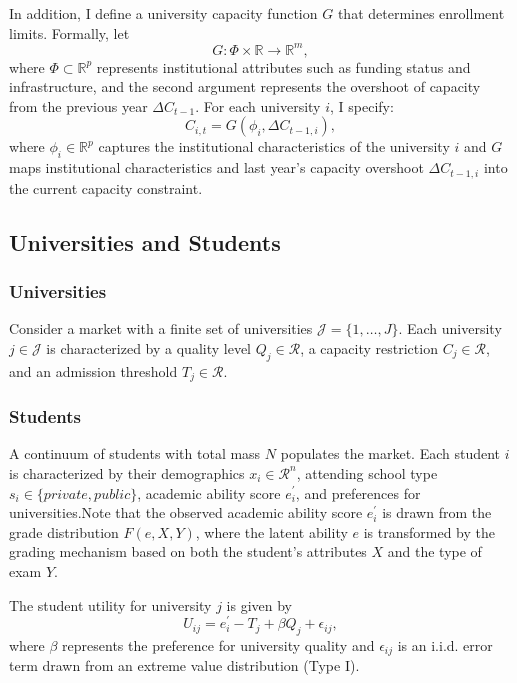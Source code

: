 In addition, I define a university capacity function \( G \) that determines enrollment limits. Formally, let
\[
G: \Phi \times \mathbb{R} \to \mathbb{R}^m,
\]
where \( \Phi \subset \mathbb{R}^p \) represents institutional attributes such as funding status and infrastructure, and the second argument represents the overshoot of capacity from the previous year \( \Delta C_{t-1} \). For each university \( i \), I specify:
\[
C_{i,t} = G(\phi_i, \Delta C_{t-1,i}),
\]
where \( \phi_i \in \mathbb{R}^p \) captures the institutional characteristics of the university \( i \) and \( G \) maps institutional characteristics and last year’s capacity overshoot \( \Delta C_{t-1,i}\) 
into the current capacity constraint.

\subsection{Universities and Students}

\subsubsection{Universities}
Consider a market with a finite set of universities $\mathcal{J} = \{1,\ldots,J\}$. Each university $j \in \mathcal{J}$ is characterized by a quality level $Q_j \in \mathcal{R}$, a capacity restriction $C_j \in \mathcal{R}$, and an admission threshold $T_j \in \mathcal{R}$. 

\subsubsection{Students}
A continuum of students with total mass \(N\) populates the market. Each student \( i \) is characterized by their demographics \( x_i \in \mathcal{R}^n \), attending school type \( s_i \in \{private, public\} \), academic ability score \( e_i^\prime \), and preferences for universities.Note that the observed academic ability score \( e_i^\prime \) is drawn from the grade distribution \(F(e,X,Y)\), where the latent ability \(e\) is transformed by the grading mechanism based on both the student’s attributes \(X\) and the type of exam 
\(Y\).

The student utility for university \( j \) is given by
\[
U_{ij} = e_i^\prime - T_j + \beta Q_j + \epsilon_{ij},
\]
where \( \beta \) represents the preference for university quality and \( \epsilon_{ij} \) is an i.i.d. error term drawn from an extreme value distribution (Type I).

